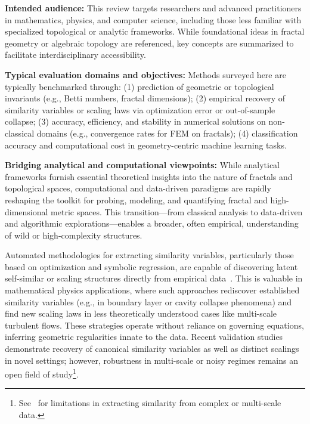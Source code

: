 \documentclass[sigconf]{acmart}
\begin{document}
\textbf{Intended audience:} This review targets researchers and advanced practitioners in mathematics, physics, and computer science, including those less familiar with specialized topological or analytic frameworks. While foundational ideas in fractal geometry or algebraic topology are referenced, key concepts are summarized to facilitate interdisciplinary accessibility.

\textbf{Typical evaluation domains and objectives:} Methods surveyed here are typically benchmarked through: 
(1) prediction of geometric or topological invariants (e.g., Betti numbers, fractal dimensions)\cite{ref26,ref39}; 
(2) empirical recovery of similarity variables or scaling laws via optimization error or out-of-sample collapse\cite{ref65}; 
(3) accuracy, efficiency, and stability in numerical solutions on non-classical domains (e.g., convergence rates for FEM on fractals)\cite{ref29,ref33}; 
(4) classification accuracy and computational cost in geometry-centric machine learning tasks\cite{ref26,ref39}.

\vspace{2mm}
\noindent\textbf{Bridging analytical and computational viewpoints:}
While analytical frameworks furnish essential theoretical insights into the nature of fractals and topological spaces, computational and data-driven paradigms are rapidly reshaping the toolkit for probing, modeling, and quantifying fractal and high-dimensional metric spaces. This transition—from classical analysis to data-driven and algorithmic explorations—enables a broader, often empirical, understanding of wild or high-complexity structures.

Automated methodologies for extracting similarity variables, particularly those based on optimization and symbolic regression, are capable of discovering latent self-similar or scaling structures directly from empirical data~\cite{ref65}. This is valuable in mathematical physics applications, where such approaches rediscover established similarity variables (e.g., in boundary layer or cavity collapse phenomena) and find new scaling laws in less theoretically understood cases like multi-scale turbulent flows. These strategies operate without reliance on governing equations, inferring geometric regularities innate to the data. Recent validation studies demonstrate recovery of canonical similarity variables as well as distinct scalings in novel settings; however, robustness in multi-scale or noisy regimes remains an open field of study\footnote{See~\cite{ref65} for limitations in extracting similarity from complex or multi-scale data.}.
\end{document}

